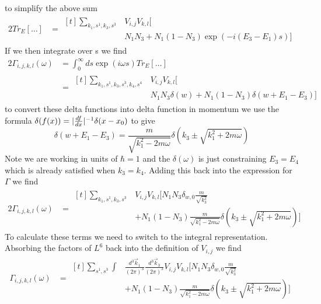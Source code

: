 to simplify the above sum
\begin{alignat}{2}
    Tr_E[\dots] & = \begin{aligned}[t]
        \sum_{k_1,s^1,k_3,s^3 }
         & V_{i,j} V_{k,l} [ \\
         & N_1 N_3
                + N_1 (1 - N_3) \exp{(-i(E_3 - E_1)s)}]
    \end{aligned}
\end{alignat}
If we then integrate over s we find
\begin{alignat}{2}
    \Gamma_{i,j, k,l}(\omega) & =
    \int_0^\infty{}{
        ds \exp{(i\omega{}s)} Tr_{E}[\dots]
    }                                                      \\
    {}                        & =\begin{aligned}[t]
        \sum_{k_1,s^1,k_3,s^3,k_4,s^4 }
         & V_{i,j} V_{k,l} [ \\
         & N_1 N_3 \delta(w)
                + N_1 (1 - N_3)  \delta(w + E_1 -E_3) ]
    \end{aligned}
\end{alignat}
to convert these delta functions
into delta function in momentum we
use the formula
\(\delta(f(x)) =
\lvert\frac{df}{dx}\rvert^{-1}\delta(x - x_0)\)
to give
\begin{equation}
    \delta(w + E_1 -E_3) =
    \frac{m}{\sqrt{k_1^2 - 2m\omega}}
    \delta({k_3 \pm \sqrt{k_1^2 + 2m\omega}})
\end{equation}
Note we are working in units of \(\hbar = 1\)
and the \(\delta(\omega)\) is just
constraining \(E_3 = E_4\) which is
already satisfied when \(k_3 = k_4\).
Adding this back into the expression
for \(\Gamma \) we find
\begin{alignat}{2}
    \Gamma_{i,j, k,l}(\omega) & =\begin{aligned}[t]
        \sum_{k_1,s^1,k_3,s^3 }
         & V_{i,j} V_{k,l} [
        N_1 N_3 \delta_{w, 0} \frac{m}{\sqrt{k_3^2}} \\
         & + N_1 (1 - N_3)
                \frac{m}{\sqrt{k_1^2 - 2m\omega}}
                \delta({k_3 \pm \sqrt{k_1^2 + 2m\omega}}) ]
    \end{aligned}
\end{alignat}
To calculate these terms we
need to switch to the integral
representation. Absorbing the factors
of \(L^6\) back into the definition
of \(V_{i,j}\) we find
\begin{align}
    \Gamma_{i,j, k,l}(\omega) & =\begin{aligned}[t]
        \sum_{s^1,s^3} \int &
        \frac{d^3\vec{k}_1}{{(2\pi)}^3}
        \frac{d^3\vec{k}_3}{{(2\pi)}^3}
        V_{i,j} V_{k,l} [
        N_1 N_3 \delta_{w, 0} \frac{m}{\sqrt{k_3^2}} \\
                            & + N_1 (1 - N_3)
                \frac{m}{\sqrt{k_1^2 - 2m\omega}}
                \delta({k_3 \pm \sqrt{k_1^2 + 2m\omega}}) ]
    \end{aligned}
\end{align}
